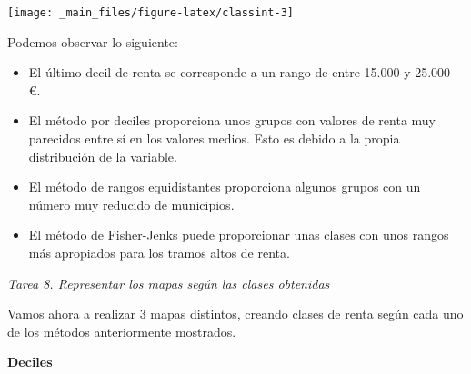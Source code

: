 \documentclass[
]{book}
\begin{document}
\begin{center}\texttt{[image: \_main\_files/figure-latex/classint-3]} \end{center}

Podemos observar lo siguiente:

\begin{itemize}
\item
  El último decil de renta se corresponde a un rango de entre 15.000 y 25.000
  €.
\item
  El método por deciles proporciona unos grupos con valores de renta muy
  parecidos entre sí en los valores medios. Esto es debido a la propia
  distribución de la variable.
\item
  El método de rangos equidistantes proporciona algunos grupos con un número
  muy reducido de municipios.
\item
  El método de Fisher-Jenks puede proporcionar unas clases con unos rangos más
  apropiados para los tramos altos de renta.
\end{itemize}

\emph{Tarea 8. Representar los mapas según las clases obtenidas}

Vamos ahora a realizar 3 mapas distintos, creando clases de renta según cada uno
de los métodos anteriormente mostrados.

\textbf{Deciles}
\end{document}
